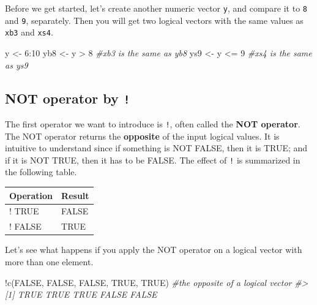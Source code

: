 \documentclass[
]{book}
\newenvironment{Shaded}{\begin{snugshade}}{\end{snugshade}}
\newcommand{\CommentTok}[1]{\textcolor[rgb]{0.56,0.35,0.01}{\textit{#1}}}
\newcommand{\ConstantTok}[1]{\textcolor[rgb]{0.00,0.00,0.00}{#1}}
\newcommand{\DecValTok}[1]{\textcolor[rgb]{0.00,0.00,0.81}{#1}}
\newcommand{\FunctionTok}[1]{\textcolor[rgb]{0.00,0.00,0.00}{#1}}
\newcommand{\NormalTok}[1]{#1}
\newcommand{\OtherTok}[1]{\textcolor[rgb]{0.56,0.35,0.01}{#1}}
\newcommand{\SpecialCharTok}[1]{\textcolor[rgb]{0.00,0.00,0.00}{#1}}
\begin{document}
Before we get started, let's create another numeric vector \texttt{y}, and compare it to \texttt{8} and \texttt{9}, separately. Then you will get two logical vectors with the same values as \texttt{xb3} and \texttt{xs4}.

\begin{Shaded}
\begin{Highlighting}[]
\NormalTok{y }\OtherTok{\textless{}{-}} \DecValTok{6}\SpecialCharTok{:}\DecValTok{10}
\NormalTok{yb8 }\OtherTok{\textless{}{-}}\NormalTok{ y }\SpecialCharTok{\textgreater{}} \DecValTok{8}           \CommentTok{\#xb3 is the same as yb8}
\NormalTok{ys9 }\OtherTok{\textless{}{-}}\NormalTok{ y }\SpecialCharTok{\textless{}=} \DecValTok{9}          \CommentTok{\#xs4 is the same as ys9}
\end{Highlighting}
\end{Shaded}

\hypertarget{not-operator-by}{%
\subsection{\texorpdfstring{NOT operator by \texttt{!}}{NOT operator by !}}\label{not-operator-by}}

The first operator we want to introduce is \texttt{!}, often called the \textbf{NOT operator}. The NOT operator returns the \textbf{opposite} of the input logical values. It is intuitive to understand since if something is NOT FALSE, then it is TRUE; and if it is NOT TRUE, then it has to be FALSE. The effect of \texttt{!} is summarized in the following table.

\begin{tabular}{l|l}
\hline
Operation & Result\\
\hline
! TRUE & FALSE\\
\hline
! FALSE & TRUE\\
\hline
\end{tabular}

Let's see what happens if you apply the NOT operator on a logical vector with more than one element.

\begin{Shaded}
\begin{Highlighting}[]
\SpecialCharTok{!}\FunctionTok{c}\NormalTok{(}\ConstantTok{FALSE}\NormalTok{, }\ConstantTok{FALSE}\NormalTok{, }\ConstantTok{FALSE}\NormalTok{, }\ConstantTok{TRUE}\NormalTok{, }\ConstantTok{TRUE}\NormalTok{)  }\CommentTok{\#the opposite of a logical vector}
\CommentTok{\#\textgreater{} [1]  TRUE  TRUE  TRUE FALSE FALSE}
\end{Highlighting}
\end{Shaded}
\end{document}
